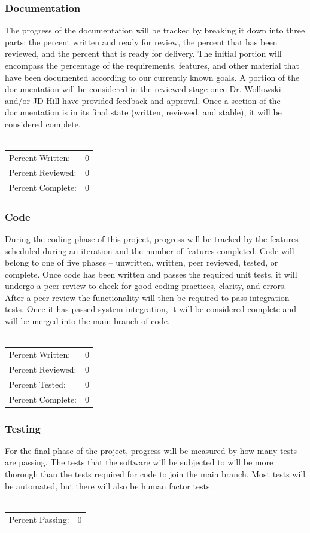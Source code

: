 \documentclass{article}
\begin{document}
\subsubsection{Documentation}
The progress of the documentation will be tracked by breaking it down into three parts: the percent written and ready for review, the percent that has been reviewed, and the percent that is ready for delivery. The initial portion will encompass the percentage of the requirements, features, and other material that have been documented according to our currently known goals. A portion of the documentation will be considered in the reviewed stage once Dr. Wollowski and/or JD Hill have provided feedback and approval. Once a section of the documentation is in its final state (written, reviewed, and stable), it will be considered complete.\\ \\
\begin{tabular}{l r}
Percent Written: & 0 \\
Percent Reviewed: & 0 \\
Percent Complete: & 0 \\
\end{tabular}
\subsubsection{Code}
During the coding phase of this project, progress will be tracked by the features scheduled during an iteration and the number of features completed. Code will belong to one of five phases – unwritten, written, peer reviewed, tested, or complete. Once code has been written and passes the required unit tests, it will undergo a peer review to check for good coding practices, clarity, and errors. After a peer review the functionality will then be required to pass integration tests. Once it has passed system integration, it will be considered complete and will be merged into the main branch of code.\\ \\
\begin{tabular}{l r}
Percent Written: & 0 \\
Percent Reviewed: & 0 \\
Percent Tested: & 0 \\
Percent Complete: & 0 \\
\end{tabular}
\subsubsection{Testing}
For the final phase of the project, progress will be measured by how many tests are passing. The tests that the software will be subjected to will be more thorough than the tests required for code to join the main branch. Most tests will be automated, but there will also be human factor tests.\\ \\
\begin{tabular}{l r}
Percent Passing: & 0 \\
\end{tabular}
\end{document}

